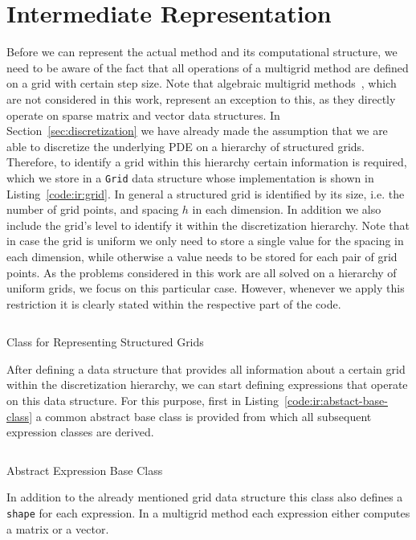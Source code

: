 \section{Intermediate Representation}
Before we can represent the actual method and its computational structure, we need to be aware of the fact that all operations of a multigrid method are defined on a grid with certain step size.
Note that algebraic multigrid methods~\cite{stuben2001introduction,ruge1987algebraic}, which are not considered in this work, represent an exception to this, as they directly operate on sparse matrix and vector data structures.
In Section~\ref{sec:discretization} we have already made the assumption that we are able to discretize the underlying PDE on a hierarchy of structured grids.
Therefore, to identify a grid within this hierarchy certain information is required, which we store in a \texttt{Grid} data structure whose implementation is shown in Listing~\ref{code:ir:grid}.
In general a structured grid is identified by its size, i.e. the number of grid points, and spacing $h$ in each dimension.
In addition we also include the grid's level to identify it within the discretization hierarchy.
Note that in case the grid is uniform we only need to store a single value for the spacing in each dimension, while otherwise a value needs to be stored for each pair of grid points.
As the problems considered in this work are all solved on a hierarchy of uniform grids, we focus on this particular case.
However, whenever we apply this restriction it is clearly stated within the respective part of the code.  
\begin{listing}
	\inputminted{python}{evostencils/ir/grid.py}
	\caption{Class for Representing Structured Grids}
	\label{code:ir:grid}
\end{listing}
After defining a data structure that provides all information about a certain grid within the discretization hierarchy, we can start defining expressions that operate on this data structure.
For this purpose, first in Listing~\ref{code:ir:abstact-base-class} a common abstract base class is provided from which all subsequent expression classes are derived.
\begin{listing}
	\inputminted{python}{evostencils/ir/expression.py}
	\caption{Abstract Expression Base Class}
	\label{code:ir:abstact-base-class}
\end{listing}
In addition to the already mentioned grid data structure this class also defines a \texttt{shape} for each expression.
In a multigrid method each expression either computes a matrix or a vector.
